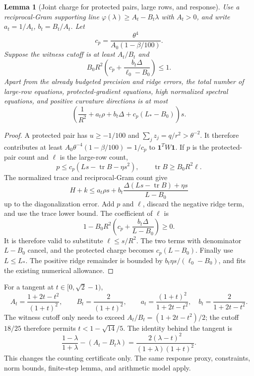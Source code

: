 \documentclass[11pt]{amsart}
\newtheorem{lemma}[theorem]{Lemma}
\theoremstyle{remark}\newtheorem{remark}[theorem]{Remark}
\newcommand{\one}{\mathbf1}
\begin{document}
\begin{lemma}[Joint charge for protected pairs, large rows, and response]
Use a reciprocal-Gram supporting line $\varphi(\lambda)\ge A_t-B_t\lambda$
with $A_t>0$, and write $a_t=1/A_t$, $b_t=B_t/A_t$.
Let
\[
 c_p=\frac{\theta^4}{A_0(1-\beta/100)}.
\]
Suppose the witness cutoff is at least $A_t/B_t$ and
\begin{equation}\label{eq:depositcondition}
 B_0R^2\left(c_p+\frac{b_t\Delta}{\ell_0-B_0}\right)\le1.
\end{equation}
Apart from the already budgeted precision and ridge errors, the total
number of large-row equations, protected-gradient equations, high
normalized spectral equations, and positive curvature directions is
at most
\[
 \left(\frac1{R^2}+a_t\rho+b_t\Delta+c_p(L_*-B_0)\right)s.
\]
\end{lemma}
\begin{proof}
A protected pair has $u\ge-1/100$ and $\sum_jz_j=q/r^2>\theta^{-2}$.
It therefore contributes at least
$A_0\theta^{-4}(1-\beta/100)=1/c_p$ to $\one^TW\one$.
If $p$ is the protected-pair count and $\ell$ is the large-row count,
\[
 p\le c_p( Ls-\operatorname{tr}B-\eta s^2),\qquad
 \operatorname{tr}B\ge B_0R^2\ell.
\]
The normalized trace and reciprocal-Gram count give
\[
 H+k\le a_t\rho s+b_t
       \frac{\Delta(Ls-\operatorname{tr}B)+\eta s}{L-B_0}
\]
up to the diagonalization error. Add $p$ and $\ell$, discard the negative
ridge term, and use the trace lower bound. The coefficient of $\ell$ is
\[
 1-B_0R^2\left(c_p+\frac{b_t\Delta}{L-B_0}\right)\ge0.
\]
It is therefore valid to substitute $\ell\le s/R^2$. The two terms with
denominator $L-B_0$ cancel, and the protected charge becomes $c_p(L-B_0)$.
Finally use $L\le L_*$. The positive ridge remainder is bounded by
$b_t\eta s/(\ell_0-B_0)$, and fits the existing numerical allowance.
\end{proof}

For a tangent at $t\in[0,\sqrt2-1)$,
\[
 A_t=\frac{1+2t-t^2}{(1+t)^2},\qquad
 B_t=\frac2{(1+t)^2},\qquad
 a_t=\frac{(1+t)^2}{1+2t-t^2},\quad
 b_t=\frac2{1+2t-t^2}.
\]
The witness cutoff only needs to exceed
$A_t/B_t=(1+2t-t^2)/2$; the cutoff $18/25$ therefore permits
$t<1-\sqrt{14}/5$. The identity behind the tangent is
\[
 \frac{1-\lambda}{1+\lambda}-(A_t-B_t\lambda)
 =\frac{2(\lambda-t)^2}{(1+\lambda)(1+t)^2}.
\]
This changes the counting certificate only. The same response proxy,
constraints, norm bounds, finite-step lemma, and arithmetic model apply.
\end{document}
